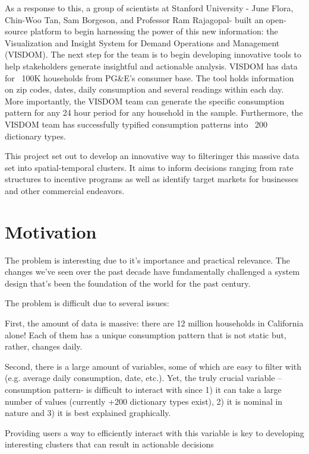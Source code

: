 \documentclass[letterpaper, 12 pt, conference]{ieeeconf}  %
\begin{document}
As a response to this, a group of scientists at Stanford University - June Flora, Chin-Woo Tan, Sam Borgeson, and Professor Ram Rajagopal- built an open-source platform to begin harnessing the power of this new information: the Visualization and Insight System for Demand Operations and Management (VISDOM). The next step for the team is to begin developing innovative tools to help stakeholders generate insightful and actionable analysis. 
VISDOM has data for ~100K households from PG\&E’s consumer base. The tool holds information on zip codes, dates, daily consumption and several readings within each day. More importantly, the VISDOM team can generate the specific consumption pattern for any 24 hour period for any household in the sample. Furthermore, the VISDOM team has successfully typified consumption patterns into ~200 dictionary types. 


This project set out to develop an innovative way to filteringer this massive data set into spatial-temporal clusters. It aims to inform decisions ranging from rate structures to incentive programs as well as identify target markets for businesses and other commercial endeavors. 

\section{Motivation}

The problem is interesting due to it’s importance and practical relevance. The changes we’ve seen over the past decade have fundamentally challenged a system design that’s been the foundation of the world for the past century. 


The problem is difficult due to several issues:


First, the amount of data is massive: there are 12 million households in California alone! Each of them has a unique consumption pattern that is not static but, rather, changes daily.


Second, there is a large amount of variables, some of which are easy to filter with (e.g. average daily consumption, date, etc.). Yet, the truly crucial variable –consumption pattern- is difficult to interact with since 1) it can take a large number of values (currently +200 dictionary types exist), 2) it is nominal in nature and 3) it is best explained graphically.


Providing users a way to efficiently interact with this variable is key to developing interesting clusters that can result in actionable decisions
\end{document}

